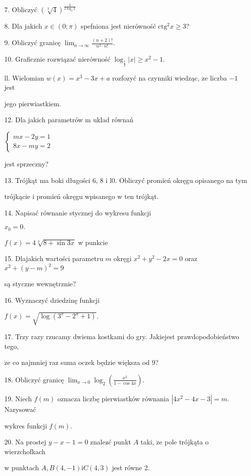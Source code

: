 \documentclass[a4paper,12pt]{article}
\begin{document}
7. Obliczyć $(\sqrt[3]{4})^{\frac{3}{2\log_{3}2}}$

8. Dla jakich $x\in(0;\pi)$ spefniona jest nierówność $\mathrm{c}\mathrm{t}\mathrm{g}^{2}x\geq 3$?

9. Obliczyć granicę $\displaystyle \lim_{n\rightarrow\infty}\frac{(n+2)!}{n^{2}\cdot n!}.$

10. Graficznie rozwiązać nierówność $\log_{\frac{1}{2}}|x|\geq x^{2}-1.$

ll. Wielomian $w(x)=x^{3}-3x+a$ rozfozyć na czynniki wiedząc, $\dot{\mathrm{z}}\mathrm{e}$ liczba $-1$ jest

jego pierwiastkiem.

12. Dla jakich parametrów m uklad równań

$\left\{\begin{array}{l}
mx-2y=1\\
8x-my=2
\end{array}\right.$

jest sprzeczny?

13. Trójkąt ma boki długości 6, 8 i l0. Obliczyć promień okręgu opisanego na tym

trójkącie i promień okręgu wpisanego w ten trójkąt.

14. Napisać równanie stycznej do wykresu funkcji

$x_{0}=0.$

$f(x)=4\sqrt[3]{8+\sin 3x}$ w punkcie

15. Dlajakich wartości parametru $m$ okręgi $x^{2}+y^{2}-2x=0$ oraz $x^{2}+(y-m)^{2}=9$

są styczne wewnętrznie?




16. Wyznaczyć dziedzinę funkcji

$f(x)=\sqrt{\log(3^{x}-2^{x}+1)}.$

17. Trzy razy rzucamy dwiema kostkami do gry. Jakiejest prawdopodobieństwo tego,

$\dot{\mathrm{z}}\mathrm{e}$ co najmniej raz suma oczek będzie większa od 9?

18. Obliczyć granicę $\displaystyle \lim_{x\rightarrow 0}\log_{2}(\frac{x^{2}}{1-\cos 4x}).$

19. Niech $f(m)$ oznacza liczbę pierwiastków równania $|4x^{2}-4x-3|=m$. Narysować

wykres funkcji $f(m).$

20. Na prostej $y-x-1=0$ znalez$\acute{}$ć punkt $A$ taki, $\dot{\mathrm{z}}\mathrm{e}$ pole trójkąta o wierzchofkach

w punktach $A, B(4,-1)\mathrm{i}C(4,3)$ jest równe 2.
\end{document}
